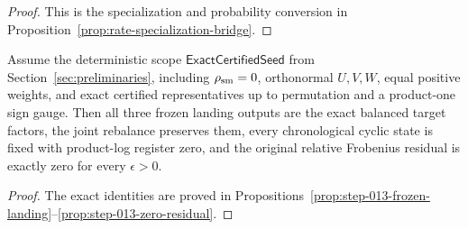 \begin{proof}
This is the specialization and probability conversion in
Proposition~\ref{prop:rate-specialization-bridge}.
\end{proof}

\begin{corollary}
\label{cor:exact-certified-seed}
Assume the deterministic scope $\mathsf{ExactCertifiedSeed}$ from
Section~\ref{sec:preliminaries}, including $\rho_{\rm sm}=0$, orthonormal
$U,V,W$, equal positive weights, and exact certified representatives up to
permutation and a product-one sign gauge. Then all three frozen landing
outputs are the exact balanced target factors, the joint rebalance preserves
them, every chronological cyclic state is fixed with product-log register
zero, and the original relative Frobenius residual is exactly zero for every
$\epsilon>0$.
\end{corollary}

\begin{proof}
The exact identities are proved in
Propositions~\ref{prop:step-013-frozen-landing}--\ref{prop:step-013-zero-residual}.
\end{proof}
